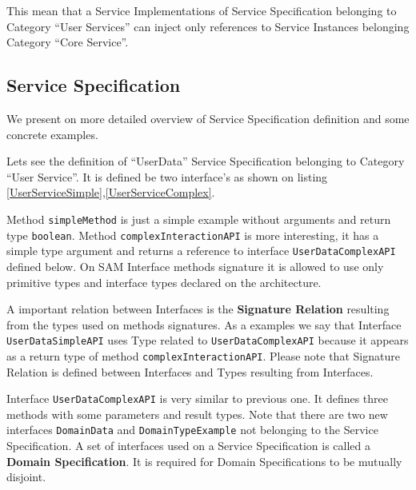 This mean that a Service Implementations of Service Specification belonging to Category ``User Services'' can inject only references to Service Instances belonging Category ``Core Service''.

\subsection{Service Specification}

We present on more detailed overview of Service Specification definition and some concrete examples.

Lets see the definition of ``UserData'' Service Specification belonging to Category ``User Service''. It is defined be two interface's as shown on listing \ref{UserServiceSimple},\ref{UserServiceComplex}.



Method \lstinline|simpleMethod| is just a simple example without arguments and return type \lstinline|boolean|. Method \lstinline|complexInteractionAPI| is more interesting, it has a simple type argument and returns a reference to interface \lstinline|UserDataComplexAPI| defined below. On SAM Interface methods signature it is allowed to use only primitive types and interface types declared on the architecture.

A important relation between Interfaces is the \textbf{Signature Relation} resulting from the types used on methods signatures. As a examples we say that Interface \lstinline|UserDataSimpleAPI| uses Type related to \lstinline|UserDataComplexAPI| because it appears as a return type of method \lstinline|complexInteractionAPI|. Please note that Signature Relation is defined between Interfaces and Types resulting from Interfaces.



Interface \lstinline|UserDataComplexAPI| is very similar to previous one. It defines three methods with some parameters and result types. Note that there are two new interfaces \lstinline|DomainData| and \lstinline|DomainTypeExample| not belonging to the Service Specification. A set of interfaces used on a Service Specification is called a \textbf{Domain Specification}. It is required for Domain Specifications to be mutually disjoint.

